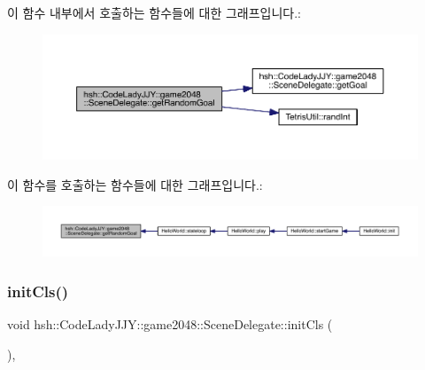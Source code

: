이 함수 내부에서 호출하는 함수들에 대한 그래프입니다.\+:
\nopagebreak
\begin{figure}[H]
\begin{center}
\leavevmode
\includegraphics[width=350pt]{classhsh_1_1_code_lady_j_j_y_1_1game2048_1_1_scene_delegate_abb107cf268a50b3ebd9bd545c88a9a35_cgraph}
\end{center}
\end{figure}
이 함수를 호출하는 함수들에 대한 그래프입니다.\+:
\nopagebreak
\begin{figure}[H]
\begin{center}
\leavevmode
\includegraphics[width=350pt]{classhsh_1_1_code_lady_j_j_y_1_1game2048_1_1_scene_delegate_abb107cf268a50b3ebd9bd545c88a9a35_icgraph}
\end{center}
\end{figure}
\mbox{\label{classhsh_1_1_code_lady_j_j_y_1_1game2048_1_1_scene_delegate_ab5504cff24fa2c916c0c6139aff67a4e}} 
\subsubsection{\texorpdfstring{init\+Cls()}{initCls()}}
{\footnotesize\ttfamily void hsh\+::\+Code\+Lady\+J\+J\+Y\+::game2048\+::\+Scene\+Delegate\+::init\+Cls (\begin{DoxyParamCaption}{ }\end{DoxyParamCaption})\hspace{0.3cm}{\ttfamily [inline]}, {\ttfamily [protected]}}



